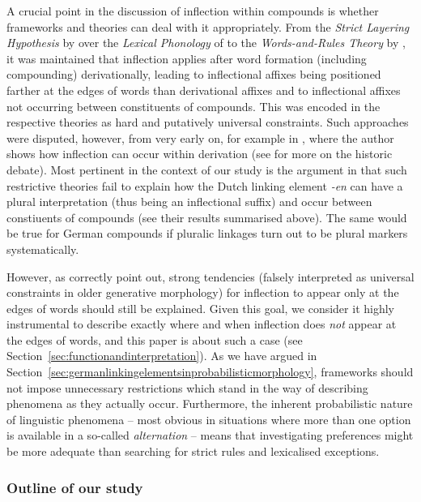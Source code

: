 A crucial point in the discussion of inflection within compounds is whether frameworks and theories can deal with it appropriately.
From the \textit{Strict Layering Hypothesis} by \textcite{Siegel1979} over the \textit{Lexical Phonology} of \textcite{Mohanan1986} to the \textit{Words-and-Rules Theory} by \textcite{Pinker1999}, it was maintained that inflection applies after word formation (including compounding) derivationally, leading to inflectional affixes being positioned farther at the edges of words than derivational affixes and to inflectional affixes not occurring between constituents of compounds.
This was encoded in the respective theories as hard and putatively universal constraints.
Such approaches were disputed, however, from very early on, for example in \textcite{Bochner1984}, where the author shows how inflection can occur within derivation (see \citealt[2--3]{KirchnerNicoladis2009} for more on the historic debate).
Most pertinent in the context of our study is the argument in \textcite[47--48]{BangaEa2013a} that such restrictive theories fail to explain how the Dutch linking element \textit{-en} can have a plural interpretation (thus being an inflectional suffix) and occur between constiuents of compounds (see their results summarised above).
The same would be true for German compounds if pluralic linkages turn out to be plural markers systematically.

However, as \textcite[5]{KirchnerNicoladis2009} correctly point out, strong tendencies (falsely interpreted as universal constraints in older generative morphology) for inflection to appear only at the edges of words should still be explained.
Given this goal, we consider it highly instrumental to describe exactly where and when inflection does \textit{not} appear at the edges of words, and this paper is about such a case (see Section~\ref{sec:functionandinterpretation}).
As we have argued in Section~\ref{sec:germanlinkingelementsinprobabilisticmorphology}, frameworks should not impose unnecessary restrictions which stand in the way of describing phenomena as they actually occur.
Furthermore, the inherent probabilistic nature of linguistic phenomena -- most obvious in situations where more than one option is available in a so-called \textit{alternation} -- means that investigating preferences might be more adequate than searching for strict rules and lexicalised exceptions.

\subsubsection{Outline of our study}

